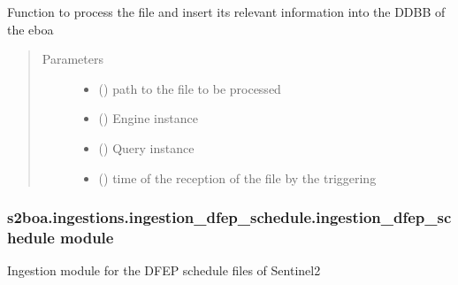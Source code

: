 \begin{fulllineitems}
\label{\detokenize{s2boa.ingestions:s2boa.ingestions.ingestion_dfep_acquisition.ingestion_dfep_acquisition.process_file}}
\sphinxAtStartPar
Function to process the file and insert its relevant information
into the DDBB of the eboa
\begin{quote}\begin{description}
\item[{Parameters}] \leavevmode\begin{itemize}
\item {} 
\sphinxAtStartPar
{} () \textendash{} path to the file to be processed

\item {} 
\sphinxAtStartPar
{} () \textendash{} Engine instance

\item {} 
\sphinxAtStartPar
{} () \textendash{} Query instance

\item {} 
\sphinxAtStartPar
{} () \textendash{} time of the reception of the file by the triggering

\end{itemize}

\end{description}\end{quote}

\end{fulllineitems}



\subsubsection{s2boa.ingestions.ingestion\_dfep\_schedule.ingestion\_dfep\_schedule module}
\label{\detokenize{s2boa.ingestions:module-s2boa.ingestions.ingestion_dfep_schedule.ingestion_dfep_schedule}}\label{\detokenize{s2boa.ingestions:s2boa-ingestions-ingestion-dfep-schedule-ingestion-dfep-schedule-module}}
\sphinxAtStartPar
Ingestion module for the DFEP schedule files of Sentinel\sphinxhyphen{}2

